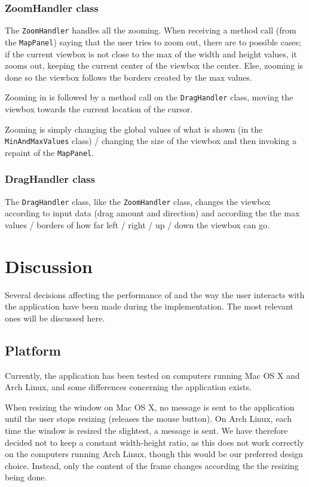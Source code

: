 \documentclass[a4paper,11pt]{article}
\begin{document}
\subsubsection{ZoomHandler class} %
The \texttt{ZoomHandler} handles all the zooming. When receiving a method call (from the \texttt{MapPanel}) saying that the user tries to zoom out, there are to possible cases; if the current viewbox is not close to the max of the width and height values, it zooms out, keeping the current center of the viewbox the center. Else, zooming is done so  the viewbox follows the borders created by the max values.

Zooming in is followed by a method call on the \texttt{DragHandler} class, moving the viewbox towards the current location of the cursor.

Zooming is simply changing the global values of what is shown (in the \texttt{MinAndMaxValues} class) / changing the size of the viewbox and then invoking a repaint of the \texttt{MapPanel}.

\subsubsection{DragHandler class} %
The \texttt{DragHandler} class, like the \texttt{ZoomHandler} class, changes the viewbox according to input data (drag amount and direction) and according the the max values / borders of how far left / right / up / down the viewbox can go.

\pagebreak
\section{Discussion} %
\label{sec:Discussion} %
Several decisions affecting the performance of and the way the user interacts with the application have been made during the implementation. The most relevant ones will be discussed here.

\subsection{Platform} %
Currently, the application has been tested on computers running Mac OS X and Arch Linux, and some differences concerning the application exists.

When resizing the window on Mac OS X, no message is sent to the application until the user stops resizing (releases the mouse button). On Arch Linux, each time the window is resized the slightest, a message is sent. We have therefore decided not to keep a constant width-height ratio, as this does not work correctly on the computers running Arch Linux, though this would be our preferred design choice. Instead, only the content of the frame changes according the the resizing being done.
\end{document}
